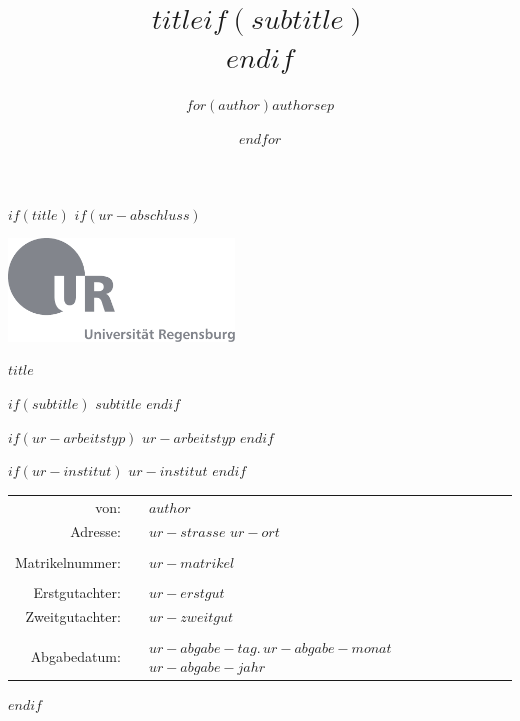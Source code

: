 \documentclass[$if(fontsize)$$fontsize$,$endif$$if(lang)$$lang$,$endif$$if(papersize)$$papersize$,$endif$$for(classoption)$$classoption$$sep$,$endfor$]{$documentclass$}
\title{$title$$if(subtitle)$\\\vspace{0.5em}{\large $subtitle$}$endif$}
\author{$for(author)$$author$$sep$ \and $endfor$}
\makeatletter
\newif \if@mainmatter \@mainmattertrue
\newcommand*\frontmatter{\clearpage\thispagestyle{plain}\@mainmatterfalse\pagenumbering{roman}}
\makeatother
\begin{document}
$if(title)$
\frontmatter
$if(ur-abschluss)$
\begin{titlepage}
  \begin{center}

  \hbox{\hspace{2.74cm}\includegraphics[width=0.45\textwidth]{Template/UR-Logo/ur-logo-mit-text.pdf}}

  \vspace{1.8cm}

  {\huge\textbf{$title$}}

  $if(subtitle)$
  \vspace{0.8cm}
  {\large{$subtitle$}}
  $endif$

  \vspace{1.5cm}

  $if(ur-arbeitstyp)$
  $ur-arbeitstyp$
  $endif$

  $if(ur-institut)$
  $ur-institut$
  $endif$

  \vspace{0.8cm}
  \begin{center}
  \begin{tabular}{ r c l }
  von:             &  & $author$                                     \\
  Adresse:         &  & \parbox[t]{4cm}{ $ur-strasse$ \\ $ur-ort$ }  \\
                   &  &                                              \\
  Matrikelnummer:  &  & $ur-matrikel$                                \\
                   &  &                                              \\
  Erstgutachter:   &  & $ur-erstgut$                                 \\
  Zweitgutachter:  &  & $ur-zweitgut$                                \\
                   &  &                                              \\
  Abgabedatum:     &  & $ur-abgabe-tag$.\,$ur-abgabe-monat$\,$ur-abgabe-jahr$
  \end{tabular}
  \end{center}
  \end{center}
\end{titlepage}
$endif$
\end{document}
